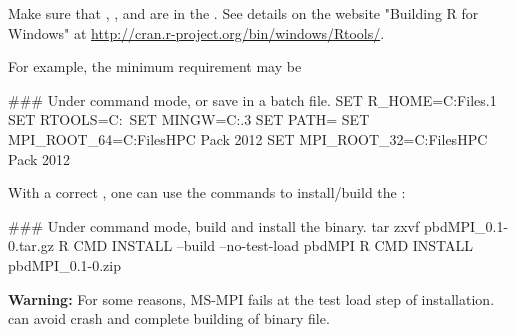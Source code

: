 Make sure that , , and  are in the
. See details on the website "Building R for Windows" at
\url{http://cran.r-project.org/bin/windows/Rtools/}.

For example, the minimum requirement may be
\begin{Command}
### Under command mode, or save in a batch file.
SET R_HOME=C:\Program Files\R{}.1
SET RTOOLS=C:\Rtools\bin\
SET MINGW=C:\Rtools{}.3\bin
SET PATH=%
SET MPI_ROOT_64=C:\Program Files\Microsoft HPC Pack 2012
SET MPI_ROOT_32=C:\Program Files\Microsoft HPC Pack 2012
\end{Command}

With a correct , one can use the  commands
to install/build the \pkg{pbdMPI}:
\begin{Command}
### Under command mode, build and install the binary.
tar zxvf pbdMPI_0.1-0.tar.gz
R CMD INSTALL --build --no-test-load pbdMPI
R CMD INSTALL pbdMPI_0.1-0.zip
\end{Command}
{\color{red} \bf Warning:} For some reasons, MS-MPI fails at the test load step
of installation. \code{-}\code{--no-test-load} can avoid crash and complete
building of binary file.
